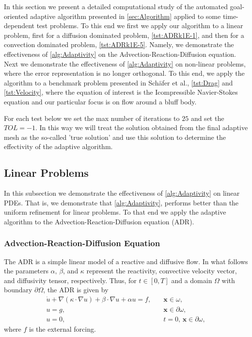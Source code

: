 In this section we present a detailed computational study of the automated
goal-oriented adaptive algorithm presented in \autoref{sec:Algorithm} applied to
some time-dependent test problems. To this end we first we apply our algorithm
to a linear problem, first for a diffusion dominated problem,
\autoref{tst:ADRk1E-1}, and then for a convection dominated problem,
\autoref{tst:ADRk1E-5}.  Namely, we demonstrate the effectiveness of
\autoref{alg:Adaptivity} on the Advection-Reaction-Diffusion equation. Next we
demonstrate the effectiveness of \autoref{alg:Adaptivity} on non-linear
problems, where the error representation is no longer orthogonal. To this end,
we apply the algorithm to a benchmark problem presented in Sch{\"a}fer et
al.\cite{Schaefer1996}, \autoref{tst:Drag} and \autoref{tst:Velocity}, where the
equation of interest is the Icompressible Navier-Stokes equation and our
particular focus is on flow around a bluff body.

For each test below we set the max number of iterations to $25$ and set the
$TOL=-1$. In this way we will treat the solution obtained from the final
adaptive mesh as the so-called 'true solution' and use this solution to
determine the effectivity of the adaptive algorithm.

\subsection{Linear Problems}
    In this subsection we demonstrate the effectiveness of
    \autoref{alg:Adaptivity} on linear PDEs. That is, we demonstrate that
    \autoref{alg:Adaptivity}, performs better than the uniform refinement for
    linear problems. To that end we apply the adaptive algorithm to
    the Advection-Reaction-Diffusion equation (ADR).

\subsubsection{Advection-Reaction-Diffusion Equation} \label{sss:ADR}
    The ADR is a simple linear model of a reactive and diffusive flow.  In what
    follows the parameters $\alpha,\,\beta$, and $\kappa$ represent the
    reactivity, convective velocity vector, and diffusivity tensor,
    respectively. Thus, for $t\in [0,T]$ and a domain $\Omega$ with boundary
    $\partial \Omega$, the ADR is given by
    \begin{equation}
        \begin{split}
            \dot{u} + \nabla \left(\kappa\cdot \nabla u \right) + \beta \cdot \nabla
                u + \alpha u = f,& \quad \mathbf{x} \in \omega, \\
            u = g,& \quad \mathbf{x} \in \partial \omega, \\
            u = 0,& \quad t = 0,\, \mathbf{x} \in \partial \omega,
        \end{split}
        \label{eq:ADR}
    \end{equation}
    where $f$ is the external forcing.

